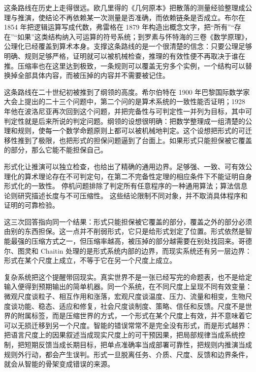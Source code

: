 这条路线在历史上走得很远。欧几里得的《几何原本》把散落的测量经验整理成公理与推演，使结论不再依赖某一次测量是否准确，而依赖链条是否成立。布尔在 1854 年把逻辑运算写成代数，弗雷格在 1879 年构造出概念文字，把“所有”“存在”“如果”这类结构纳入可运算的符号系统；到罗素与怀特海的三卷《数学原理》，公理化已经覆盖到算术本身。支撑这条路线的是一个很清楚的信念：只要公理足够明确、规则足够严格，证明就可以被机械检查，推理的有效性便不再取决于谁在推。压缩率也在这里达到极致，一条规则可以覆盖无穷多个实例，一个结构可以替换掉全部具体内容，而被压掉的内容并不需要被记住。

这条路线在二十世纪初被推到了纲领的高度。希尔伯特在 1900 年巴黎国际数学家大会上提出的二十三个问题中，第二个问的是算术系统的一致性能否证明；1928 年他在波洛尼亚再次回到这个问题，并把完备性与可判定性一并列为目标，其中可判定性就是后来所说的判定问题。纲领的设想很明确：把数学整理成一组清楚的公理和规则，使每一个数学命题原则上都可以被机械地判定。这个设想把形式的可迁移性推到了极限，也把形式的担保问题逼到了台面上。如果形式只能担保被它覆盖的部分，那么它能不能担保自己。


形式化让推演可以独立检查，也给出了精确的通用边界。足够强、一致、可有效公理化的算术理论存在不可判定句，在第二不完备性定理的相应条件下不能证明自身形式化的一致性。\cite{godel1931} 停机问题排除了判定所有任意程序的一种通用算法；算法信息论则研究描述长度与不可压缩性。\cite{turing1936,chaitin1987} 这些结论限制不同对象，并不取消具体程序和证明的可靠检验。

这三次回答指向同一个结果：形式只能担保被它覆盖的部分，覆盖之外的部分必须由别的东西担保。这一点并不削弱形式，它只是给形式划定了位置。形式依然是智能最强的压缩方式之一，但压缩率越高，被压掉的部分越需要在别处找回来。哥德尔、图灵和 Chaitin 处理的是形式系统内部的边界，而现实系统还有另一层边界：形式在某个尺度上成立，不等于它在另一个尺度上成立。

复杂系统把这个提醒带回现实。真实世界不是一张已经写完的命题表，也不是给定输入便得到预期输出的简单机器。同一个系统，在不同尺度上呈现不同有效变量：微观尺度谈粒子、相互作用和涨落，宏观尺度谈温度、压力、流量和相变，生物尺度谈功能、稳态、适应和修复，社会尺度谈制度、策略、信任和反馈。尺度不是世界的附属标签，而是压缩世界的方式，一个形式在某个尺度上有效，并不意味着它可以无损迁移到另一个尺度。智能的错误常常不是完全没有形式，而是形式越界：把语言尺度上的因果叙述当成现实尺度上的可干预因果，把局部规律当成系统控制，把短期反馈当成长期目标，把单点准确率当成部署可靠性，把规则内推演当成规则外行动，都会产生误判。形式一旦脱离任务、介质、尺度、反馈和边界条件，就会从智能的骨架变成错误的来源。

